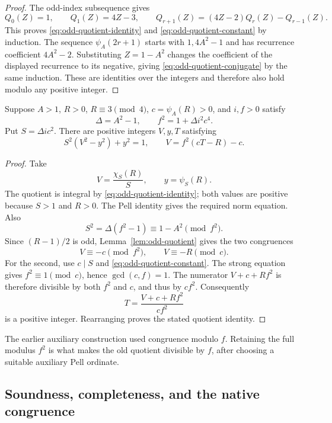 \begin{proof}
The odd-index subsequence gives
\[
 Q_0(Z)=1,\qquad Q_1(Z)=4Z-3,\qquad
 Q_{r+1}(Z)=(4Z-2)Q_r(Z)-Q_{r-1}(Z).
\]
This proves \eqref{eq:odd-quotient-identity} and
\eqref{eq:odd-quotient-constant} by induction.  The sequence
\(\psi_A(2r+1)\) starts with \(1,4A^2-1\) and has recurrence coefficient
\(4A^2-2\).  Substituting \(Z=1-A^2\) changes the coefficient of the
displayed recurrence to its negative, giving
\eqref{eq:odd-quotient-conjugate} by the same induction.  These are
identities over the integers and therefore also hold modulo any positive
integer.
\end{proof}

\begin{lemma}
\label{lem:squared-modulus-reconstruction}
Suppose \(A>1\), \(R>0\), \(R\equiv3\pmod4\),
\(c=\psi_A(R)>0\), and \(i,f>0\) satisfy
\[
 \Delta=A^2-1,\qquad f^2=1+\Delta i^2c^4.
\]
Put \(S=\Delta ic^2\).  There are positive integers \(V,y,T\) satisfying
\[
 S^2(V^2-y^2)+y^2=1,\qquad V=f^2(cT-R)-c.
\]
\end{lemma}

\begin{proof}
Take
\[
 V=\frac{\chi_S(R)}{S},\qquad y=\psi_S(R).
\]
The quotient is integral by \eqref{eq:odd-quotient-identity}; both values
are positive because \(S>1\) and \(R>0\).  The Pell identity gives the
required norm equation.  Also
\[
 S^2=\Delta(f^2-1)\equiv1-A^2\pmod{f^2}.
\]
Since \((R-1)/2\) is odd, Lemma~\ref{lem:odd-quotient} gives the two
congruences
\begin{equation}
 V\equiv-c\pmod{f^2},\qquad V\equiv-R\pmod c.
 \label{eq:squared-modulus-congruences}
\end{equation}
For the second, use \(c\mid S\) and
\eqref{eq:odd-quotient-constant}.  The strong equation gives
\(f^2\equiv1\pmod c\), hence \(\gcd(c,f)=1\).
The numerator \(V+c+Rf^2\) is therefore divisible by both \(f^2\) and
\(c\), and thus by \(cf^2\).  Consequently
\[
 T=\frac{V+c+Rf^2}{cf^2}
\]
is a positive integer.  Rearranging proves the stated quotient identity.
\end{proof}

The earlier auxiliary construction used congruence modulo \(f\).  Retaining
the full modulus \(f^2\) is what makes the old quotient divisible by
\(f\), after choosing a suitable auxiliary Pell ordinate.

\subsection{Soundness, completeness, and the native congruence}

